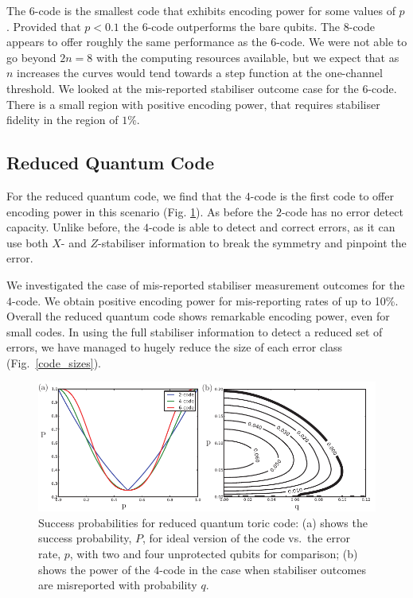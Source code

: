 The $6$-code is the smallest code that exhibits encoding power for some values of $p$. Provided that $p < 0.1$ the $6$-code outperforms the bare qubits. The $8$-code appears to offer roughly the same performance as the $6$-code. We were not  able to go beyond $2n=8$ with the computing resources available, but we expect that as $n$ increases the curves would tend towards a step function at the one-channel threshold.  We looked at the mis-reported stabiliser outcome case for the $6$-code. There is a small region with positive encoding power, that requires stabiliser fidelity in the region of $1\%$.

\subsection{Reduced Quantum Code}

For the reduced quantum code, we find that the $4$-code is the first code to offer encoding power in this scenario (Fig. \ref{y_results}). As before the $2$-code has no error detect capacity. Unlike before, the $4$-code is able to detect and correct errors, as it can use both $X$- and $Z$-stabiliser information to break the symmetry and pinpoint the error. 

We investigated the case of mis-reported stabiliser measurement outcomes for the $4$-code. We obtain positive encoding power for mis-reporting rates of up to 10\%. Overall the reduced quantum code shows remarkable encoding power, even for small codes. In using the full stabiliser information to detect a reduced set of errors, we have managed to hugely reduce the size of each error class (Fig.~\ref{code_sizes}). 
\begin{figure}[htb]
  \begin{center}
    \includegraphics{assets/y_results.pdf}
  \end{center}
  \caption{Success probabilities for reduced quantum toric code: (a) shows the success probability, $P$, for ideal version of the code vs.\ the error rate, $p$, with two and four unprotected qubits for comparison; (b) shows the power of the $4$-code in the case when stabiliser outcomes are misreported with probability $q$.}
  \label{y_results}
\end{figure}


